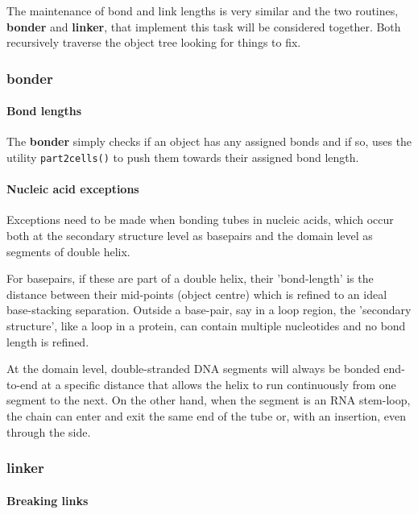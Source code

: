 \documentclass[review]{elsarticle}
\newcommand{\TT}[1]{{\ttfamily\bfseries #1}}
\begin{document}
{{{{{The maintenance of bond and link lengths is very similar and the two routines,
\TT{bonder} and \TT{linker}, that implement this task will be considered together.
Both recursively traverse the object tree looking for things to fix.

\subsubsection{\TT{bonder}}

\paragraph{Bond lengths}

The \TT{bonder} simply checks if an object has any assigned bonds and if so, uses
the utility {\tt part2cells()} to push them towards their assigned bond length.

\paragraph{Nucleic acid exceptions}

Exceptions need to be made when bonding tubes in nucleic acids, which occur both at
the secondary structure level as basepairs and the domain level
as segments of double helix. 

For basepairs, if these are part of a double helix, their 'bond-length' is the distance
between their mid-points (object centre) which is refined to an ideal base-stacking separation.  
Outside a base-pair, say in a loop region, the 'secondary structure', like a loop in a protein,
can contain multiple nucleotides and no bond length is refined.

At the domain level, double-stranded DNA segments will always be bonded end-to-end
at a specific distance that allows the helix to run continuously from one segment to
the next.   On the other hand, when the segment is an RNA stem-loop, the chain can enter
and exit the same end of the tube or, with an insertion, even through the side.


\subsubsection{\TT{linker}}

\paragraph{Breaking links}

}}}}}
\end{document}
